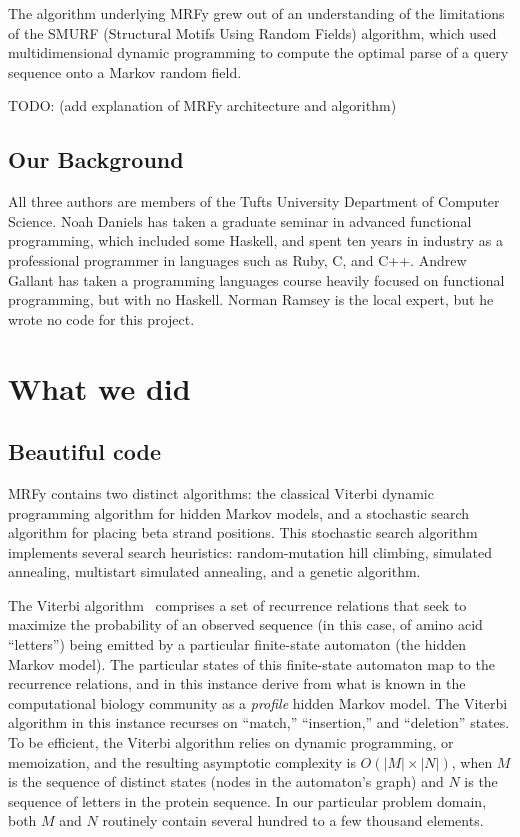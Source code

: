 \documentclass[preprint]{sigplanconf}
\begin{document}
The algorithm underlying MRFy grew out of an understanding of the limitations 
of the SMURF (Structural Motifs Using Random Fields) algorithm, which used 
multidimensional dynamic programming to compute the optimal parse of a query 
sequence onto a Markov random field.


TODO: (add explanation of MRFy architecture and algorithm)

\subsection{Our Background}

All three authors are members of the Tufts University Department of Computer 
Science. Noah Daniels has taken a graduate seminar in advanced functional 
programming, which included some Haskell, and spent ten years in industry as a 
professional programmer in languages such as Ruby, C, and C++. Andrew Gallant 
has taken a programming languages course heavily focused on functional 
programming, but with no Haskell. Norman Ramsey is the local expert, but he 
wrote no code for this project.

\section{What we did}

\subsection{Beautiful code}
MRFy contains two distinct algorithms: the classical Viterbi dynamic 
programming algorithm for hidden Markov models, and a stochastic search 
algorithm for placing beta strand positions. This stochastic search algorithm 
implements several search heuristics: random-mutation hill climbing, simulated 
annealing, multistart simulated annealing, and a genetic algorithm.


The Viterbi algorithm~\cite{Viterbi:1967} comprises a set of recurrence 
relations that seek to maximize the probability of an observed sequence (in 
this case, of amino acid ``letters'') being emitted by a particular 
finite-state automaton (the hidden Markov model). The particular states of this 
finite-state automaton map to the recurrence relations, and in this instance 
derive from what is known in the computational biology community as a 
\textit{profile} hidden Markov model. The Viterbi algorithm in this instance 
recurses on ``match,'' ``insertion,'' and ``deletion'' states. To be efficient, 
the Viterbi algorithm relies on dynamic programming, or memoization, and the 
resulting asymptotic complexity is $O(|M|\times|N|)$, when $M$ is the sequence 
of distinct states (nodes in the automaton's graph) and $N$ is the sequence of 
letters in the protein sequence. In our particular problem domain, both $M$ and 
$N$ routinely contain several hundred to a few thousand elements.
\end{document}
